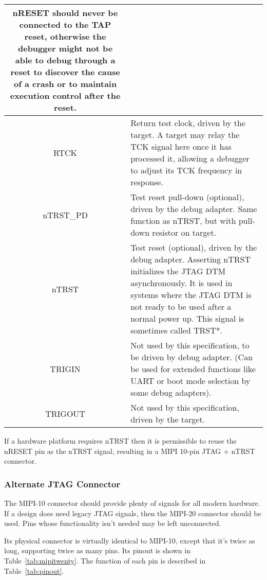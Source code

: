 \begin{table}[htp]
\begin{tabulary}{\textwidth}{|c|L|}
        nRESET should never be connected to the TAP reset, otherwise the
        debugger might not be able to debug through a reset to discover the
        cause of a crash or to maintain execution control after the reset. \\
      \hline
      RTCK & Return test clock, driven by the target. A target may relay
        the TCK signal here once it has processed it, allowing a debugger to
        adjust its TCK frequency in response. \\
      \hline
      nTRST\_PD & Test reset pull-down (optional), driven by the debug
        adapter. Same function as nTRST, but with pull-down resistor on target.
        \\
      \hline
      nTRST & Test reset (optional), driven by the debug adapter. Asserting
        nTRST initializes the JTAG DTM asynchronously. It is used in systems
        where the JTAG DTM is not ready to be used after a normal power up. This
        signal is sometimes called TRST*. \\
      \hline
      TRIGIN & Not used by this specification, to be driven by debug
        adapter.  (Can be used for extended functions like UART or boot mode
        selection by some debug adapters). \\
      \hline
      TRIGOUT & Not used by this specification, driven by the target. \\
      \hline
    \end{tabulary}
\end{table}

If a hardware platform requires nTRST then it is permissible to reuse the nRESET pin as
the nTRST signal, resulting in a MIPI 10-pin JTAG + nTRST connector.

\subsubsection{Alternate JTAG Connector}

The MIPI-10 connector should provide plenty of signals for all modern hardware.
If a design does need legacy JTAG signals, then the
MIPI-20 connector should be used. Pins whose functionality isn't needed may be
left unconnected.

Its physical connector is virtually identical
to MIPI-10, except that it's twice as long, supporting twice as many pins. Its
pinout is shown in Table~\ref{tab:mipitwenty}. The function of each pin
is described in Table~\ref{tab:pinout}.

